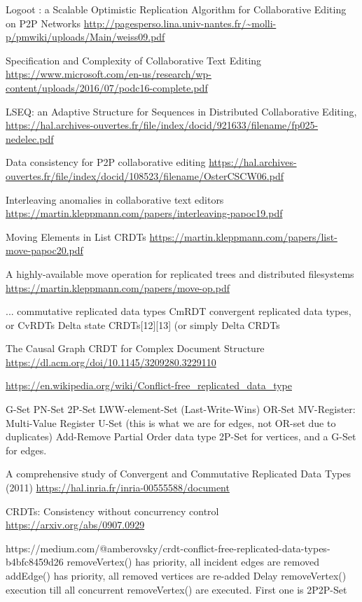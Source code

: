 Logoot : a Scalable Optimistic Replication Algorithm for Collaborative Editing on P2P Networks
  \url{http://pagesperso.lina.univ-nantes.fr/~molli-p/pmwiki/uploads/Main/weiss09.pdf}

Specification and Complexity of Collaborative Text Editing
  \url{https://www.microsoft.com/en-us/research/wp-content/uploads/2016/07/podc16-complete.pdf}

LSEQ: an Adaptive Structure for Sequences in Distributed Collaborative Editing,
  \url{https://hal.archives-ouvertes.fr/file/index/docid/921633/filename/fp025-nedelec.pdf}

Data consistency for P2P collaborative editing
  \url{https://hal.archives-ouvertes.fr/file/index/docid/108523/filename/OsterCSCW06.pdf}

Interleaving anomalies in collaborative text editors
  \url{https://martin.kleppmann.com/papers/interleaving-papoc19.pdf}

Moving Elements in List CRDTs
  \url{https://martin.kleppmann.com/papers/list-move-papoc20.pdf}

A highly-available move operation for replicated trees and distributed filesystems
  \url{https://martin.kleppmann.com/papers/move-op.pdf}

...
 commutative replicated data types CmRDT
 convergent replicated data types, or CvRDTs
 Delta state CRDTs[12][13] (or simply Delta CRDTs

The Causal Graph CRDT for Complex Document Structure
  \url{https://dl.acm.org/doi/10.1145/3209280.3229110}

\url{https://en.wikipedia.org/wiki/Conflict-free_replicated_data_type}

G-Set
PN-Set
2P-Set
LWW-element-Set (Last-Write-Wins)
OR-Set
MV-Register: Multi-Value Register
U-Set (this is what we are for edges, not OR-set due to duplicates)
Add-Remove Partial Order data type
  2P-Set for vertices, and a G-Set for edges.

A comprehensive study of Convergent and Commutative Replicated Data Types (2011)
  \url{https://hal.inria.fr/inria-00555588/document}

CRDTs: Consistency without concurrency control
  \url{https://arxiv.org/abs/0907.0929}

https://medium.com/@amberovsky/crdt-conflict-free-replicated-data-types-b4bfc8459d26
 removeVertex() has priority, all incident edges are removed
 addEdge() has priority, all removed vertices are re-added
 Delay removeVertex() execution till all concurrent removeVertex() are executed.
First one is 2P2P-Set

